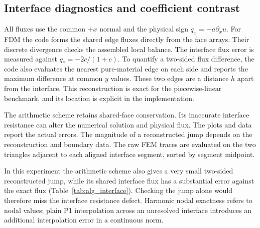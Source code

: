 \begin{table}[H]\centering\small

\caption{Median stage costs from three repetitions. CG excludes Jacobi setup in this table; LU includes factorisation and one triangular solve. The cost--accuracy plot additionally includes assembly and Jacobi setup.}
\end{table}

\subsection{Interface diagnostics and coefficient contrast}
All fluxes use the common $+x$ normal and the physical sign $q_x=-a\partial_xu$. For FDM the code forms the shared edge fluxes directly from the face arrays. Their discrete divergence checks the assembled local balance. The interface flux error is measured against $q_*=-2c/(1+c)$. To quantify a two-sided flux difference, the code also evaluates the nearest pure-material edge on each side and reports the maximum difference at common $y$ values. These two edges are a distance $h$ apart from the interface. This reconstruction is exact for the piecewise-linear benchmark, and its location is explicit in the implementation.

The arithmetic scheme retains shared-face conservation. Its inaccurate interface resistance can alter the numerical solution and physical flux. The plots and data report the actual errors. The magnitude of a reconstructed jump depends on the reconstruction and boundary data. The raw FEM traces are evaluated on the two triangles adjacent to each aligned interface segment, sorted by segment midpoint.

In this experiment the arithmetic scheme also gives a very small two-sided reconstructed jump, while its shared interface flux has a substantial error against the exact flux (Table~\ref{tab:alg_interface}). Checking the jump alone would therefore miss the interface resistance defect. Harmonic nodal exactness refers to nodal values; plain P1 interpolation across an unresolved interface introduces an additional interpolation error in a continuous norm.

\begin{table}[H]\centering\small

\caption{Layered diagnostics at neighbouring mesh sizes, $c=10$. $E_q$ is the maximum interface flux error; $J_q$ is the explicitly defined two-sided flux difference. Mesh parity follows each method's interface treatment.}
\label{tab:alg_interface}
\end{table}

